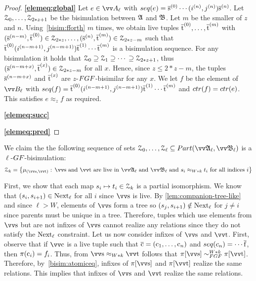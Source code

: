 \begin{proof}
\noindent
\textbf{\ref{elemeq:global}}
Let $e \in \unraveldom{A}_{\ell}$ with $\seq{e} = \elemtuples^{(0)}\cdots{}(i^{(n)}, j^{(n)})\elemtuples^{(n)}$.
Let $\mathcal{Z}_{0}, \ldots, \mathcal{Z}_{2*z + 1}$ be the bisimulation between ${\mathfrak{A}}$ and ${\mathfrak{B}}$.
Let $m$ be the smaller of $z$ and $n$.
Using~\ref{bisim:fforth} $m$ times, we obtain live tuples $\overline{\mathrm{t}}^{(0)}, \ldots, \overline{\mathrm{t}}^{(m)}$ with $(\overline{\mathrm{s}}^{(n-m)}, \overline{\mathrm{t}}^{(0)}) \in \mathcal{Z}_{2*z}, \ldots, (\overline{\mathrm{s}}^{(n)}, \overline{\mathrm{t}}^{(m)}) \in \mathcal{Z}_{2*z - m}$ such that $\overline{\mathrm{t}}^{(0)}(i^{(n-m+1)}, j^{(n-m+1)})\overline{\mathrm{t}}^{(1)}\cdots{}\overline{\mathrm{t}}^{(m)}$ is a bisimulation sequence.
For any bisimulation it holds that $\mathcal{Z}_{0} \supseteq \mathcal{Z}_{1} \supseteq \cdots{} \supseteq \mathcal{Z}_{2*z+1}$, thus
$(\overline{\mathrm{s}}^{(n-m+x)}, \overline{\mathrm{t}}^{(x)}) \in \mathcal{Z}_{2*z - m}$ for all $x$.
Hence, since $z \le 2*z - m$, the tuples $\overline{\mathrm{s}}^{(n-m+x)}$ and $\overline{\mathrm{t}}^{(x)}$ are $z$-$\FGF$-bisimilar for any $x$.
We let $f$ be the element of $\unraveldom{B}_{\ell}$ with $\seq{f} = \elemtuplet^{(0)}(i^{(n-m+1)}, j^{(n-m+1)})\elemtuplet^{(1)}\cdots{}\elemtuplet^{(m)}$ and $\ctr{f} = \ctr{e}$.
This satisfies $e \approx_{z} f$ as required.

\noindent
\textbf{\ref{elemeq:succ}}

\noindent
\textbf{\ref{elemeq:pred}}
\end{proof}

We claim the the following sequence of sets $\bisimZ_{0}, \ldots, \bisimZ_{\ell} \subseteq \PartIso{\unravel{A}_{\ell}}{\unravel{B}_{\ell}}$ is a $\ell$-$\GF$-bisimulation:
\begin{equation*}
  \bisimZ_{k} = \left\{
    \mu_{(\elemtuptuples, \elemtuptuplet)}:\,
    \elemtuptuples\ \text{and}\ \elemtuptuplet\ \text{are live in}\ \unravel{A}_{\ell}\ \text{and}\ \unravel{B}_{\ell}\
    \text{and}\ s_{i} \approx_{W * k} t_{i}\ \text{for all indices $i$}
  \right\}
\end{equation*}

First, we show that each map $s_{i} \mapsto t_{i} \in \mathcal{Z}_{k}$ is a partial isomorphism.
We know that $(s_{i}, s_{i+1}) \in \mathrm{Next}_{\ell}$ for all $i$ since $\elemtuptuples$ is live.
By \cref{lem:companion-tree-like} and since $\ell > W$, elements of $\elemtuptuples$ form a tree so $(s_{j}, s_{i+1}) \notin \mathrm{Next}_{\ell}$ for $j \ne i$ since parents must be unique in a tree.
Therefore, tuples which use elements from $\elemtuptuples$ but are not infixes of $\elemtuptuples$ cannot realize any relations since they do not satisfy the $\mathrm{Next}_{\ell}$ constraint.
Let us now consider infixes of $\elemtuptuples$ and $\elemtuptuplet$.
First, observe that if $\elemtuptuplec$ is a live tuple such that $\overline{\mathrm{c}} = (\mathrm{c}_{1}, \ldots, \mathrm{c}_{n})$ and $\seq{c_{n}} = \cdots \elemtuplef$, then $\pi(\mathrm{c}_{i}) = f_{i}$.
Thus, from $\elemtuptuples \approx_{W * k} \elemtuptuplet$ follows that $\pi[\elemtuptuples] \bisimto_{\FGF}^{W * k} \pi[\elemtuptuplet]$.
Therefore, by~\ref{bisim:atomiceq}, infixes of $\pi[\elemtuptuples]$ and $\pi[\elemtuptuplet]$ realize the same relations.
This implies that infixes of $\elemtuptuples$ and $\elemtuptuplet$ realize the same relations.

